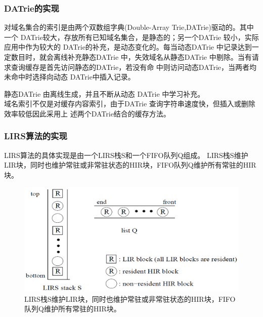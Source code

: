 \subsubsection{DATrie的实现}
\par{	对域名集合的索引是由两个双数组字典(Double-Array Trie,DATrie)驱动的。其中
	一个 DATrie较大，存放所有已知域名集合，是静态的；另一个DATrie 较小，实际应用中作为较大的
	DATrie的补充，是动态变化的。每当动态DATrie 中记录达到一定数目时，就会离线补充静态DATrie
	中，失效域名从静态DATrie 中剔除。当有请求查询缓存是首先访问静态的DATrie，若没有命
中则访问动态DATrie，当两者均未命中时选择向动态 DATrie中插入记录。 
}

 静态DATrie 由离线生成，并且不断从动态 DATrie 中学习补充。 
\\ 域名索引不仅是对缓存内容索引，由于DATrie 查询字符串速度快，但插入或删除效率较低因此采用上
	述两个DATrie结合的缓存方法。 

\subsubsection{LIRS算法的实现}
LIRS算法的具体实现是由一个LIRS栈S和一个FIFO队列Q组成。
LIRS栈S维护LIR块，同时也维护常驻或非常驻状态的HIR块，FIFO队列Q维护所有常驻的HIR块。
\begin{figure}[H]
\centering
\includegraphics[keepaspectratio, scale=0.4]{pitures/lirsstack.png}
\caption{LIRS栈S维护LIR块，同时也维护常驻或非常驻状态的HIR块，FIFO队列Q维护所有常驻的HIR块。} 
\end{figure}


